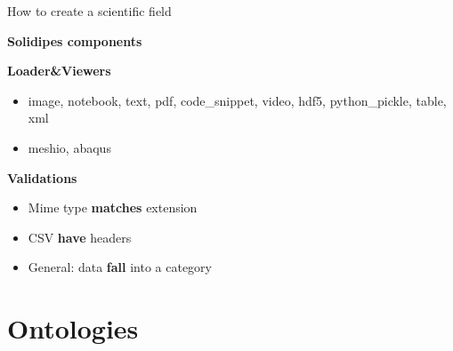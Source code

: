 \documentclass[10pt,compress,serif,aspectratio=169]{beamer}
\begin{document}
\begin{frame}{How to create a scientific field}
  \begin{minipage}{.56\textwidth}
\textbf{Solidipes components}\newline \newline
\end{minipage}
  \begin{minipage}{.4\textwidth}
\textbf{Loader\&Viewers}
  \begin{itemize}
    \item image, notebook, text, pdf, code\_snippet, video, hdf5, python\_pickle, table, xml
    \item meshio, abaqus
 \end{itemize}

\vfill

\textbf{Validations}
  \begin{itemize}
    \item Mime type \textbf{matches} extension
    \item CSV \textbf{have} headers
    \item General: data \textbf{fall} into a category
  \end{itemize}

\end{minipage}
\end{frame}


\section{Ontologies}
\end{document}
